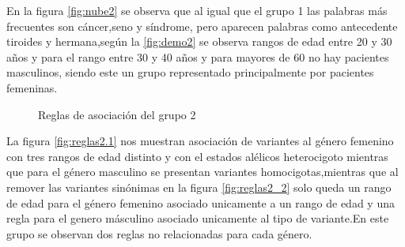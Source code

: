 En la figura \ref{fig:nube2} se observa que al igual que el grupo 1 las palabras más frecuentes son cáncer,seno y síndrome, pero aparecen palabras como antecedente tiroides y hermana,según la \ref{fig:demo2} se observa rangos de edad entre 20 y 30 años y para el rango entre 30 y 40 años y para mayores de 60 no hay pacientes masculinos, siendo este un grupo representado principalmente por pacientes femeninas.  

\begin{figure}[H]
	\centering
	\caption{Reglas de asociación del grupo 2}\label{fig:reglas2}
\end{figure}

La figura \ref{fig:reglas2.1} nos muestran asociación de variantes al género femenino con tres rangos de edad distinto y con el estados alélicos heterocigoto mientras que para el género masculino se presentan variantes homocigotas,mientras que al remover las variantes sinónimas en la figura \ref{fig:reglas2_2} solo queda un rango de edad para el género femenino asociado unicamente a un rango de edad y una regla para el genero másculino asociado unicamente al tipo de variante.En este grupo se observan dos reglas no relacionadas para cada género.

